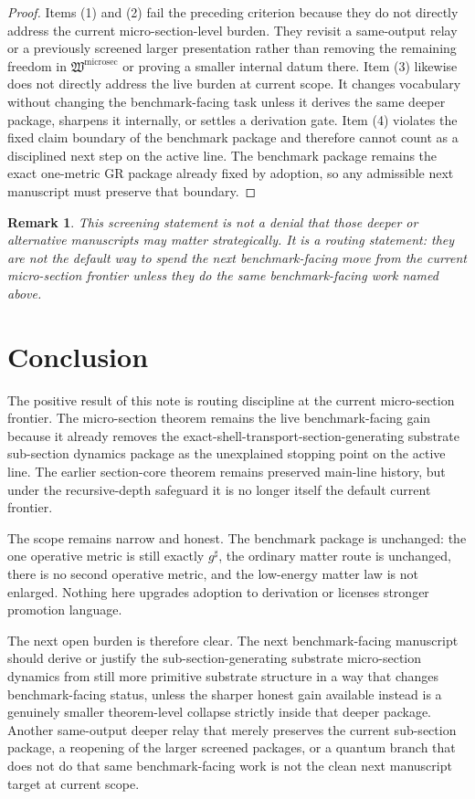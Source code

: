 \documentclass[11pt]{article}
\newcommand{\CompletedMetric}{g^{\sharp}}
\newcommand{\MicroSectionPackage}{\mathfrak W^{\mathrm{microsec}}}
\newtheorem{remark}{Remark}
\begin{document}
\begin{proof}
Items (1) and (2) fail the preceding criterion because they do not directly address the current micro-section-level burden. They revisit a same-output relay or a previously screened larger presentation rather than removing the remaining freedom in \(\MicroSectionPackage\) or proving a smaller internal datum there. Item (3) likewise does not directly address the live burden at current scope. It changes vocabulary without changing the benchmark-facing task unless it derives the same deeper package, sharpens it internally, or settles a derivation gate. Item (4) violates the fixed claim boundary of the benchmark package and therefore cannot count as a disciplined next step on the active line. The benchmark package remains the exact one-metric GR package already fixed by adoption, so any admissible next manuscript must preserve that boundary.
\end{proof}

\begin{remark}
This screening statement is not a denial that those deeper or alternative manuscripts may matter strategically. It is a routing statement: they are not the default way to spend the next benchmark-facing move from the current micro-section frontier unless they do the same benchmark-facing work named above.
\end{remark}

\section{Conclusion}

The positive result of this note is routing discipline at the current micro-section frontier. The micro-section theorem remains the live benchmark-facing gain because it already removes the exact-shell-transport-section-generating substrate sub-section dynamics package as the unexplained stopping point on the active line. The earlier section-core theorem remains preserved main-line history, but under the recursive-depth safeguard it is no longer itself the default current frontier.

The scope remains narrow and honest. The benchmark package is unchanged: the one operative metric is still exactly \(\CompletedMetric\), the ordinary matter route is unchanged, there is no second operative metric, and the low-energy matter law is not enlarged. Nothing here upgrades adoption to derivation or licenses stronger promotion language.

The next open burden is therefore clear. The next benchmark-facing manuscript should derive or justify the sub-section-generating substrate micro-section dynamics from still more primitive substrate structure in a way that changes benchmark-facing status, unless the sharper honest gain available instead is a genuinely smaller theorem-level collapse strictly inside that deeper package. Another same-output deeper relay that merely preserves the current sub-section package, a reopening of the larger screened packages, or a quantum branch that does not do that same benchmark-facing work is not the clean next manuscript target at current scope.
\end{document}
